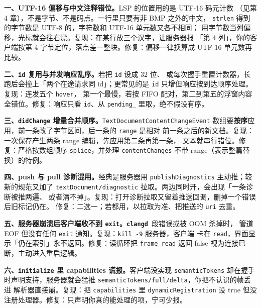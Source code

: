 \documentclass[12pt,a4paper,fontset=fandol]{ctexbook}
\newcommand{\Bk}{\discretionary{}{}{}}
\newcommand{\Lib}[1]{\textbf{\texttt{#1}}}
\newcommand{\CD}{\Lib{clangd}}
\begin{document}
\textbf{一、UTF-16 偏移与中文注释错位。}LSP 的位置用的是 UTF-16 码元计数
（见第 4 章），不是字节、不是码点。一行里只要有非 BMP 之外的中文，
\texttt{strlen} 得到的字节数是 UTF-8 的，字符数和 UTF-16 单元数又各不相同；
用字节数当列偏移，光标就会往右漂。复现：在某行放三个汉字，让服务器报
「第 4 列」，你的客户端按第 4 字节定位，落点差一整块。修复：偏移一律换算成
UTF-16 单元数再比较。

\textbf{二、\texttt{id} 复用与并发响应乱序。}若把 \texttt{id} 设成 32 位、
或每次握手重置计数器，长跑后会撞上「两个在途请求同 id」；更常见的是
\texttt{id} 只增但响应按到达顺序处理。复现：连发五个 \texttt{hover}，
第一个最慢，若按 FIFO 配对，第二到第五的浮窗内容全错位。修复：响应只看
\texttt{id}、从 \texttt{pending\_} 里取，绝不假设有序。

\textbf{三、\texttt{didChange} 增量合并顺序。}\texttt{TextDocumentContentChangeEvent}
数组要\textbf{按序}应用，前一条改了字节区间，后一条的 \texttt{range} 是相对
前一条之后的新文档。复现：一次保存产生两条 range 编辑，先应用第二条再第一条，
文本就串行错位。修复：严格按数组顺序 \texttt{splice}，并处理
\texttt{contentChanges} 不带 range（表示整篇替换）的特例。

\textbf{四、push 与 pull 诊断混用。}经典是服务器用
\texttt{publish}\Bk\texttt{Diagnostics} 主动推；较新的规范又加了
\texttt{textDocument/diagnostic} 拉取。两边同时开，会出现「一条诊断被推两遍、
或者清不掉」。复现：打开诊断拉取又留着推送回调，删掉一个错误后旧标记仍在。
修复：二选一；若都用，以拉取为准、把推送的 \texttt{uri} 去重。

\textbf{五、服务器崩溃后客户端收不到 \texttt{exit}。}\CD\ 段错误或被 OOM 杀掉时，
管道 EOF 但没有任何 \texttt{exit} 通知。复现：\texttt{kill -9} 服务器，客户端
卡在 \texttt{read}，界面显示「仍在索引」永不返回。修复：读循环把
\texttt{frame\_read} 返回 false 视为连接已断，主动进入重启逻辑。

\textbf{六、\texttt{initialize} 里 capabilities 谎报。}客户端没实现
\texttt{semanticTokens} 却在握手时声明支持，服务器就会猛推
\texttt{semanticTokens/}\Bk\texttt{full}\Bk\texttt{/delta}，你把不认识的帧丢进
解析器直接崩。复现：把 \texttt{capabilities} 里 \texttt{dynamicRegistration}
设 true 但没注册处理器。修复：只声明你真的能处理的项，宁可少报。
\end{document}
